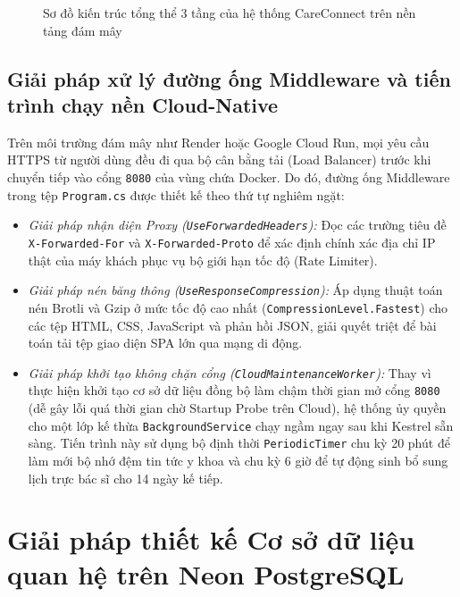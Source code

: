 \begin{figure}[H]
\caption{Sơ đồ kiến trúc tổng thể 3 tầng của hệ thống CareConnect trên nền tảng đám mây}
\label{fig:cloud_arch}
\end{figure}

\subsection{Giải pháp xử lý đường ống Middleware và tiến trình chạy nền Cloud-Native}

Trên môi trường đám mây như Render hoặc Google Cloud Run, mọi yêu cầu HTTPS từ người dùng đều đi qua bộ cân bằng tải (Load Balancer) trước khi chuyển tiếp vào cổng \texttt{8080} của vùng chứa Docker. Do đó, đường ống Middleware trong tệp \texttt{Program.cs} được thiết kế theo thứ tự nghiêm ngặt:
\begin{itemize}
    \item \textit{Giải pháp nhận diện Proxy (\texttt{UseForwardedHeaders}):} Đọc các trường tiêu đề \texttt{X-Forwarded-For} và \texttt{X-Forwarded-Proto} để xác định chính xác địa chỉ IP thật của máy khách phục vụ bộ giới hạn tốc độ (Rate Limiter).
    \item \textit{Giải pháp nén băng thông (\texttt{UseResponseCompression}):} Áp dụng thuật toán nén Brotli và Gzip ở mức tốc độ cao nhất (\texttt{CompressionLevel.Fastest}) cho các tệp HTML, CSS, JavaScript và phản hồi JSON, giải quyết triệt để bài toán tải tệp giao diện SPA lớn qua mạng di động.
    \item \textit{Giải pháp khởi tạo không chặn cổng (\texttt{CloudMaintenanceWorker}):} Thay vì thực hiện khởi tạo cơ sở dữ liệu đồng bộ làm chậm thời gian mở cổng \texttt{8080} (dễ gây lỗi quá thời gian chờ Startup Probe trên Cloud), hệ thống ủy quyền cho một lớp kế thừa \texttt{BackgroundService} chạy ngầm ngay sau khi Kestrel sẵn sàng. Tiến trình này sử dụng bộ định thời \texttt{PeriodicTimer} chu kỳ 20 phút để làm mới bộ nhớ đệm tin tức y khoa và chu kỳ 6 giờ để tự động sinh bổ sung lịch trực bác sĩ cho 14 ngày kế tiếp.
\end{itemize}

\section{Giải pháp thiết kế Cơ sở dữ liệu quan hệ trên Neon PostgreSQL}

